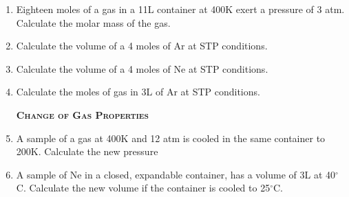 \documentclass[main.tex]{subfiles}
\begin{document}
\begin{multicols*}{2}
\begin{enumerate}
\item Eighteen moles of a gas in a 11L container at 400K exert a pressure of 3 atm. Calculate the molar mass of the gas.
\begin{enumerate}[label=(\alph*)]
\end{enumerate}
\item Calculate the volume of a 4 moles of Ar at STP conditions.

\item Calculate the volume of a 4 moles of Ne at STP conditions.

\item Calculate the moles of gas in 3L  of Ar at STP conditions.

{\raggedright\textsc{\textbf{Change of Gas Properties }}\par}

\item A sample of a gas at 400K and 12 atm is cooled in the same container to 200K. Calculate the new pressure
\begin{enumerate}[label=(\alph*)]
\end{enumerate}

\item A sample of Ne in a closed, expandable container, has a volume of 3L at 40$^\circ$C. Calculate the new volume if the container is cooled to 25$^\circ$C.
\begin{enumerate}[label=(\alph*)]
\end{enumerate}



\end{enumerate}
\end{multicols*}
\end{document}
